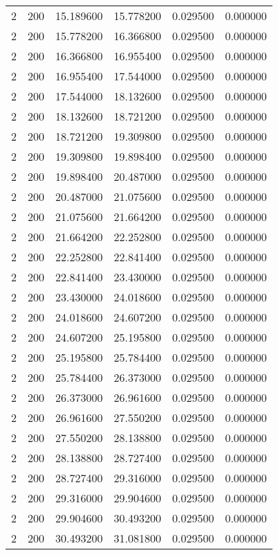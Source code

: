 \begin{longtable}{rrrrrr}
2 & 200 & 15.189600 & 15.778200 & 0.029500 & 0.000000 \\
2 & 200 & 15.778200 & 16.366800 & 0.029500 & 0.000000 \\
2 & 200 & 16.366800 & 16.955400 & 0.029500 & 0.000000 \\
2 & 200 & 16.955400 & 17.544000 & 0.029500 & 0.000000 \\
2 & 200 & 17.544000 & 18.132600 & 0.029500 & 0.000000 \\
2 & 200 & 18.132600 & 18.721200 & 0.029500 & 0.000000 \\
2 & 200 & 18.721200 & 19.309800 & 0.029500 & 0.000000 \\
2 & 200 & 19.309800 & 19.898400 & 0.029500 & 0.000000 \\
2 & 200 & 19.898400 & 20.487000 & 0.029500 & 0.000000 \\
2 & 200 & 20.487000 & 21.075600 & 0.029500 & 0.000000 \\
2 & 200 & 21.075600 & 21.664200 & 0.029500 & 0.000000 \\
2 & 200 & 21.664200 & 22.252800 & 0.029500 & 0.000000 \\
2 & 200 & 22.252800 & 22.841400 & 0.029500 & 0.000000 \\
2 & 200 & 22.841400 & 23.430000 & 0.029500 & 0.000000 \\
2 & 200 & 23.430000 & 24.018600 & 0.029500 & 0.000000 \\
2 & 200 & 24.018600 & 24.607200 & 0.029500 & 0.000000 \\
2 & 200 & 24.607200 & 25.195800 & 0.029500 & 0.000000 \\
2 & 200 & 25.195800 & 25.784400 & 0.029500 & 0.000000 \\
2 & 200 & 25.784400 & 26.373000 & 0.029500 & 0.000000 \\
2 & 200 & 26.373000 & 26.961600 & 0.029500 & 0.000000 \\
2 & 200 & 26.961600 & 27.550200 & 0.029500 & 0.000000 \\
2 & 200 & 27.550200 & 28.138800 & 0.029500 & 0.000000 \\
2 & 200 & 28.138800 & 28.727400 & 0.029500 & 0.000000 \\
2 & 200 & 28.727400 & 29.316000 & 0.029500 & 0.000000 \\
2 & 200 & 29.316000 & 29.904600 & 0.029500 & 0.000000 \\
2 & 200 & 29.904600 & 30.493200 & 0.029500 & 0.000000 \\
2 & 200 & 30.493200 & 31.081800 & 0.029500 & 0.000000 \\

\end{longtable}
